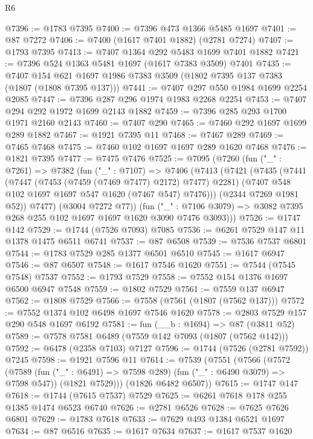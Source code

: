 \begin{lexlean}{R6}
\begin{coremodule}
@7396 := @1783 @7395
@7400 := @7396 @473 @1366 @5485 @1697
@7401 := @87 @7272
@7406 := @7400 (@1617 @7401 @1882) (@2781 @7274)
@7407 := @1793 @7395
@7413 := @7407 @1364 @292 @5483 @1699 @7401 @1882
@7421 := @7396 @524 @1363 @5481 @1697 (@1617 @7383 @3509) @7401
@7435 := @7407 @154 @621 @1697 @1986 @7383 @3509 (@1802 @7395 @137 @7383 (@1807 (@1808 @7395 @137)))
@7441 := @7407 @297 @550 @1984 @1699 @2254 @2085
@7447 := @7396 @287 @296 @1974 @1983 @2268 @2254
@7453 := @7407 @294 @292 @1972 @1699 @2143 @1882
@7459 := @7396 @285 @293 @1700 @1971 @2160 @2143
@7460 := @7407 @290
@7465 := @7460 @292 @1697 @1699 @289 @1882
@7467 := @1921 @7395 @11
@7468 := @7467 @289
@7469 := @7465 @7468
@7475 := @7460 @102 @1697 @1697 @289 @1620 @7468
@7476 := @1821 @7395
@7477 := @7475 @7476
@7525 := @7095
    (@7260
      (fun ("_" : @7261) =>
      @7382
        (fun ("_" : @7107) =>
        @7406
          (@7413
            (@7421
              (@7435
                (@7441
                  (@7447 (@7453 (@7459 (@7469 @7477) @2172) @7477) @2281)
                  (@7407 @548 @102 @1697 @1697 @547 @1620 (@7467 @547) @7476)))
              (@2344 @7269 @1981 @52))
            @7477)
          (@3004 @7272 @77))
        (fun ("_" : @7106 @3079) =>
        @3082 @7395 @268 @255 @102 @1697 @1697 @1620 @3090 @7476 @3093)))
@7526 := @1747 @142
@7529 := @1744 (@7526 @7093) @7085
@7536 := @6261 @7529 @147 @11 @1378 @1475 @6511 @6741
@7537 := @87 @6508
@7539 := @7536 @7537 @6801
@7544 := @1783 @7529 @285 @1377 @6501 @6510
@7545 := @1617 @6947
@7546 := @87 @6507
@7548 := @1617 @7546 @1620
@7551 := @7544 (@7545 @7548) @7537
@7552 := @1793 @7529
@7558 := @7552 @154 @1376 @1697 @6500 @6947 @7548
@7559 := @1802 @7529
@7561 := @7559 @137 @6947
@7562 := @1808 @7529
@7566 := @7558 (@7561 (@1807 (@7562 @137)))
@7572 := @7552 @1374 @102 @6498 @1697 @7546 @1620
@7578 := @2803 @7529 @157 @290 @548 @1697 @6192
@7581 := fun (__b : @1694) => @87 (@3811 @52)
@7589 := @7578 @7581 @6489 (@7559 @142 @7093 (@1807 (@7562 @142)))
@7592 := @6478 (@2358 @7103) @7127
@7596 := @1744 (@7526 (@2781 @7592)) @7245
@7598 := @1921 @7596 @11
@7614 := @7539
    (@7551
      (@7566
        (@7572
          (@7589 (fun ("_" : @6491) => @7598 @289) (fun ("_" : @6490 @3079) => @7598 @547))
          (@1821 @7529)))
      (@1826 @6482 @6507))
@7615 := @1747 @147
@7618 := @1744 (@7615 @7537) @7529
@7625 := @6261 @7618 @178 @255 @1385 @1474 @6523 @6740
@7626 := @2781 @6526
@7628 := @7625 @7626 @6801
@7629 := @1783 @7618
@7633 := @7629 @493 @1384 @6521 @1697
@7634 := @87 @6516
@7635 := @1617 @7634
@7637 := @1617 @7537 @1620

\end{coremodule}
\end{lexlean}
